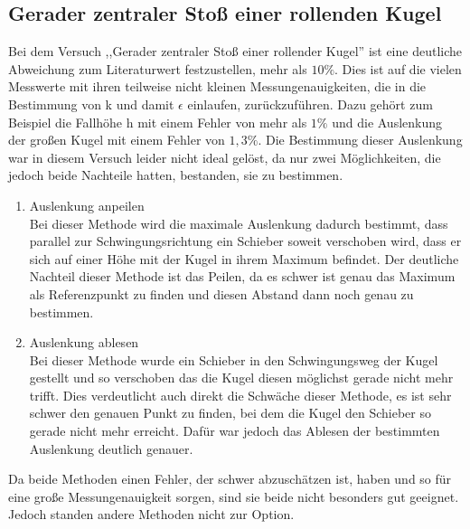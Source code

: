 \subsection{Gerader zentraler Stoß einer rollenden Kugel}
Bei dem Versuch ,,Gerader zentraler Stoß einer rollender Kugel'' ist eine deutliche Abweichung zum Literaturwert festzustellen, mehr als $10\%$. Dies ist auf die vielen Messwerte mit ihren teilweise nicht kleinen Messungenauigkeiten, die in die Bestimmung von k und damit $\epsilon$ einlaufen, zurückzuführen. Dazu gehört zum Beispiel die Fallhöhe h mit einem Fehler von mehr als $1\%$ und die Auslenkung der großen Kugel mit einem Fehler von $1,3\%$.
Die Bestimmung dieser Auslenkung war in diesem Versuch leider nicht ideal gelöst, da nur zwei Möglichkeiten, die jedoch beide Nachteile hatten, bestanden, sie zu bestimmen.
\begin{enumerate}
\item Auslenkung anpeilen\\
Bei dieser Methode wird die maximale Auslenkung dadurch bestimmt, dass parallel zur Schwingungsrichtung ein Schieber soweit verschoben wird, dass er sich auf einer Höhe mit der Kugel in ihrem Maximum befindet. Der deutliche Nachteil dieser Methode ist das Peilen, da es schwer ist genau das Maximum als Referenzpunkt zu finden und diesen Abstand dann noch genau zu bestimmen.
\item Auslenkung ablesen\\
Bei dieser Methode wurde ein Schieber in den Schwingungsweg der Kugel gestellt und so verschoben das die Kugel diesen möglichst gerade nicht mehr trifft. Dies verdeutlicht auch direkt die Schwäche dieser Methode, es ist sehr schwer den genauen Punkt zu finden, bei dem die Kugel den Schieber so gerade nicht mehr erreicht. Dafür war jedoch das Ablesen der bestimmten Auslenkung deutlich genauer.
\end{enumerate}
Da beide Methoden einen Fehler, der schwer abzuschätzen ist, haben und so für eine große Messungenauigkeit sorgen, sind sie beide nicht besonders gut geeignet. Jedoch standen andere Methoden nicht zur Option.

\nocite{anleitung-ws2014}
